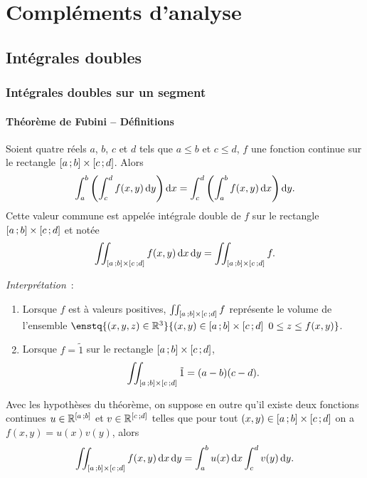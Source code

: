 \chapter{Compléments d'analyse}
\label{chap:complementsanalyse}
\minitoc
\minilof
\minilot

\section{Intégrales doubles}

\subsection{Intégrales doubles sur un segment}

\subsubsection{Théorème de Fubini -- Définitions}

\begin{theo}[Admis]
  Soient quatre réels $a$, $b$, $c$ et $d$ tels que $a\leq b$ et $c \leq d$, $f$ une fonction continue sur le rectangle $\left[ a \, ;  b \right] \times \left[ c \, ;  d \right]$. Alors
  \begin{equation}
    \int_a^b\left(\int_c^d f(x,y)\mathop{}\mathopen{}\mathrm{d} y \right)\mathop{}\mathopen{}\mathrm{d} x = \int_c^d\left(\int_a^b f(x,y)\mathop{}\mathopen{}\mathrm{d} x\right)\mathop{}\mathopen{}\mathrm{d} y. 
  \end{equation}
Cette valeur commune est appelée intégrale double de $f$ sur le rectangle $\left[ a \, ;  b \right] \times \left[ c \, ;  d \right]$ et notée
\begin{equation}
  \iint_{\left[ a \, ;  b \right] \times \left[ c \, ;  d \right]}f(x,y) \mathop{}\mathopen{}\mathrm{d} x \mathop{}\mathopen{}\mathrm{d} y = \iint_{\left[ a \, ;  b \right] \times \left[ c \, ;  d \right]}f.
\end{equation}
\end{theo}

\emph{Interprétation}~:
\begin{enumerate}
\item Lorsque $f$ est à valeurs positives, $\iint_{\left[ a \, ;  b \right] \times \left[ c \, ;  d \right]}f$ représente le volume de l'ensemble $\enstq{(x,y,z)\in\R^3}{(x,y) \in \intervalleff{a}{b} \times \intervalleff{c}{d} \ 0 \leq z \leq f(x,y)}$.
\item Lorsque $f=\tilde{1}$ sur le rectangle $\left[ a \, ;  b \right] \times \left[ c \, ;  d \right]$,
  \begin{equation}
     \iint_{\left[ a \, ;  b \right] \times \left[ c \, ;  d \right]}\tilde{1}=(a-b)(c-d).
  \end{equation}
\end{enumerate}
\begin{corth}
  Avec les hypothèses du théorème, on suppose en outre qu'il existe deux fonctions continues $u \in \mathbb{R}^{\left[ a \, ;  b \right]}$ et $v \in \mathbb{R}^{\left[ c \, ;  d \right]}$ telles que pour tout $(x, y) \in \left[ a \, ;  b \right] \times \left[ c \, ;  d \right]$ on a $f(x,y)=u(x)v(y)$, alors
  \begin{equation}
    \iint_{\left[ a \, ;  b \right] \times \left[ c \, ;  d \right]} f(x,y)\mathop{}\mathopen{}\mathrm{d} x \mathop{}\mathopen{}\mathrm{d} y = \int_a^b u(x)\mathop{}\mathopen{}\mathrm{d} x \int_c^d v(y)\mathop{}\mathopen{}\mathrm{d} y.
  \end{equation}
\end{corth}

